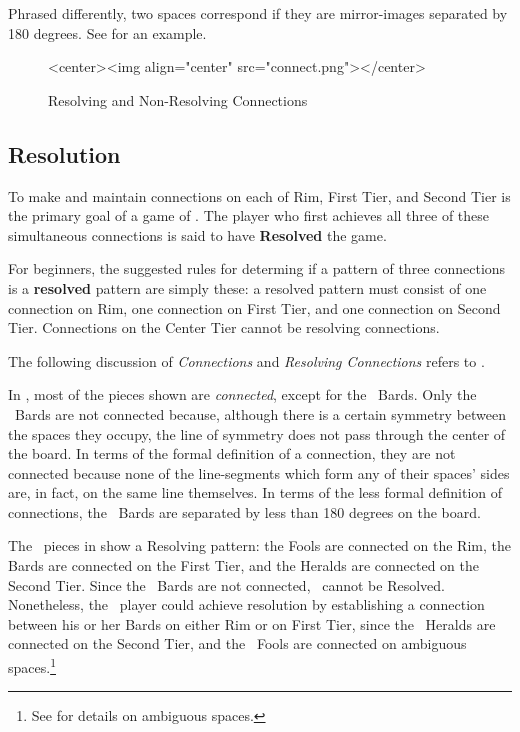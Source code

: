 Phrased differently, two spaces correspond if they 
are mirror-images separated by 180 degrees.  See
 for an example.


\begin{figure}
  \begin{rawhtml}
    <center><img align="center" src="connect.png"></center>
  \end{rawhtml}
  \caption{Resolving and Non-Resolving Connections}
  \label{connect_fig}
\end{figure}


\subsection{Resolution}\label{resolution}
To make and maintain connections on each of Rim, First Tier, and Second Tier
is the primary goal of a game of \know.
The player who first achieves all three of these simultaneous connections is said
to have {\bf Resolved} the game.

For beginners, the suggested rules for determing if a pattern of three connections
is a {\bf resolved} pattern are simply these: a resolved pattern must consist of
one connection on Rim, one connection on First Tier, and one connection on
Second Tier.  Connections on the Center Tier cannot be resolving connections.

The following discussion of {\sl Connections} and {\sl Resolving Connections}
refers to .


In , most of the pieces shown are {\sl connected},
except for the \bcolor\ Bards.  Only the \bcolor\ Bards are not connected because, although
there is a certain symmetry between the spaces they occupy, the line of symmetry does
not pass through the center of the board.  In terms of the formal definition of a connection,
they are not connected because none of the line-segments which form any of their spaces'
sides are, in fact, on the same line themselves.  In terms of the less formal definition
of connections, the \bcolor\ Bards are separated by less than 180 degrees on the
board.

The \acolor\ pieces in  show a Resolving pattern:
the Fools are connected on the Rim,
the Bards are connected on the First Tier, and the Heralds are connected on the
Second Tier.  Since the \bcolor\ Bards are not connected, \bcolor\ cannot be
Resolved.  Nonetheless, the \bcolor\ player could achieve resolution by
establishing a connection between his or her Bards on either Rim or on First
Tier, since the \bcolor\ Heralds are connected on the Second Tier, and the
\bcolor\ Fools are connected on ambiguous spaces.\footnote{
  See  for details on ambiguous spaces.
  }


